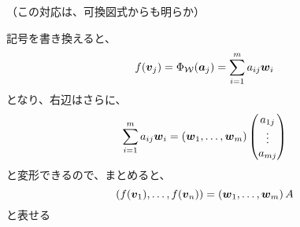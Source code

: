 \documentclass[../../../topic_linear-algebra]{subfiles}
\begin{document}
（この対応は、可換図式からも明らか）

\br

記号を書き換えると、
\begin{equation*}
  f(\vb*{v}_j) = \Phi_{\mathcal{W}}(\vb*{a}_j) = \sum_{i=1}^m a_{ij} \vb*{w}_i
\end{equation*}
となり、右辺はさらに、
\begin{equation*}
  \sum_{i=1}^m a_{ij} \vb*{w}_i = (\vb*{w}_1, \ldots, \vb*{w}_m) \begin{pmatrix}
    a_{1j} \\
    \vdots \\
    a_{mj}
  \end{pmatrix}
\end{equation*}
と変形できるので、まとめると、
\begin{equation*}
  \left( f(\vb*{v}_1),\ldots, f(\vb*{v}_n) \right) = \left( \vb*{w}_1, \ldots, \vb*{w}_m \right) A
\end{equation*}
と表せる
\end{document}
